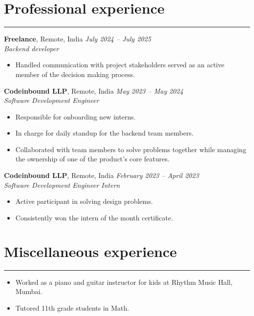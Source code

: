 \documentclass[11pt]{article}
\begin{document}
\vspace{-0.5\baselineskip}
\section*{Professional experience}
\hrule

\textbf{Freelance}, Remote, India \hfill \textit{July 2024 -- July 2025} \\
\textit{Backend developer} \\
\vspace{-1.5\baselineskip}
\begin{itemize}[label=--]
	\item Handled communication with project stakeholders served as an
		active member of the decision making process.
\end{itemize}

\textbf{Codeinbound LLP}, Remote, India \hfill \textit{May 2023 -- May 2024} \\
\textit{Software Development Engineer} \\
\vspace{-1.5\baselineskip}
\begin{itemize}[label=--]
	\item Responsible for onboarding new interns.
	\item In charge for daily standup for the backend team members.
	\item Collaborated with team members to solve problems together while
		managing the ownership of one of the product's core features.
\end{itemize}

\textbf{Codeinbound LLP}, Remote, India \hfill
\textit{February 2023 -- April 2023} \\
\textit{Software Development Engineer Intern} \\
\vspace{-1.5\baselineskip}
\begin{itemize}[label=--]
	\item Active participant in solving design problems.
	\item Consistently won the intern of the month certificate.
\end{itemize}

\vspace{-0.5\baselineskip}
\section*{Miscellaneous experience}
\hrule
\begin{itemize}[label=--]
	\item Worked as a piano and guitar instructor for kids at Rhythm Music
		Hall, Mumbai.
	\item Tutored 11th grade students in Math.
\end{itemize}
\vspace{-0.5\baselineskip}
\end{document}
